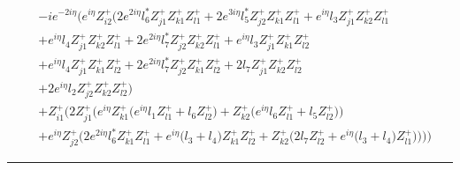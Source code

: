 \begin{align} 
 &-i e^{-2 i \eta } \Big(e^{i \eta } Z_{{i 2}}^{+} \Big(2 e^{2 i \eta } l_6^* Z_{{j 1}}^{+} Z_{{k 1}}^{+} Z_{{l 1}}^{+} +2 e^{3 i \eta } l_5^* Z_{{j 2}}^{+} Z_{{k 1}}^{+} Z_{{l 1}}^{+} +e^{i \eta } l_3 Z_{{j 1}}^{+} Z_{{k 2}}^{+} Z_{{l 1}}^{+} \nonumber \\ 
 &+e^{i \eta } l_4 Z_{{j 1}}^{+} Z_{{k 2}}^{+} Z_{{l 1}}^{+} +2 e^{2 i \eta } l_7^* Z_{{j 2}}^{+} Z_{{k 2}}^{+} Z_{{l 1}}^{+} +e^{i \eta } l_3 Z_{{j 1}}^{+} Z_{{k 1}}^{+} Z_{{l 2}}^{+} \nonumber \\ 
 &+e^{i \eta } l_4 Z_{{j 1}}^{+} Z_{{k 1}}^{+} Z_{{l 2}}^{+} +2 e^{2 i \eta } l_7^* Z_{{j 2}}^{+} Z_{{k 1}}^{+} Z_{{l 2}}^{+} +2 l_7 Z_{{j 1}}^{+} Z_{{k 2}}^{+} Z_{{l 2}}^{+} \nonumber \\ 
 &+2 e^{i \eta } l_2 Z_{{j 2}}^{+} Z_{{k 2}}^{+} Z_{{l 2}}^{+} \Big)\nonumber \\ 
 &+Z_{{i 1}}^{+} \Big(2 Z_{{j 1}}^{+} \Big(e^{i \eta } Z_{{k 1}}^{+} \Big(e^{i \eta } l_1 Z_{{l 1}}^{+}  + l_6 Z_{{l 2}}^{+} \Big) + Z_{{k 2}}^{+} \Big(e^{i \eta } l_6 Z_{{l 1}}^{+}  + l_5 Z_{{l 2}}^{+} \Big)\Big)\nonumber \\ 
 &+e^{i \eta } Z_{{j 2}}^{+} \Big(2 e^{2 i \eta } l_6^* Z_{{k 1}}^{+} Z_{{l 1}}^{+}  + e^{i \eta } \Big(l_3 + l_4\Big)Z_{{k 1}}^{+} Z_{{l 2}}^{+}  + Z_{{k 2}}^{+} \Big(2 l_7 Z_{{l 2}}^{+}  + e^{i \eta } \Big(l_3 + l_4\Big)Z_{{l 1}}^{+} \Big)\Big)\Big)\Big)\end{align} 
\hrule 

